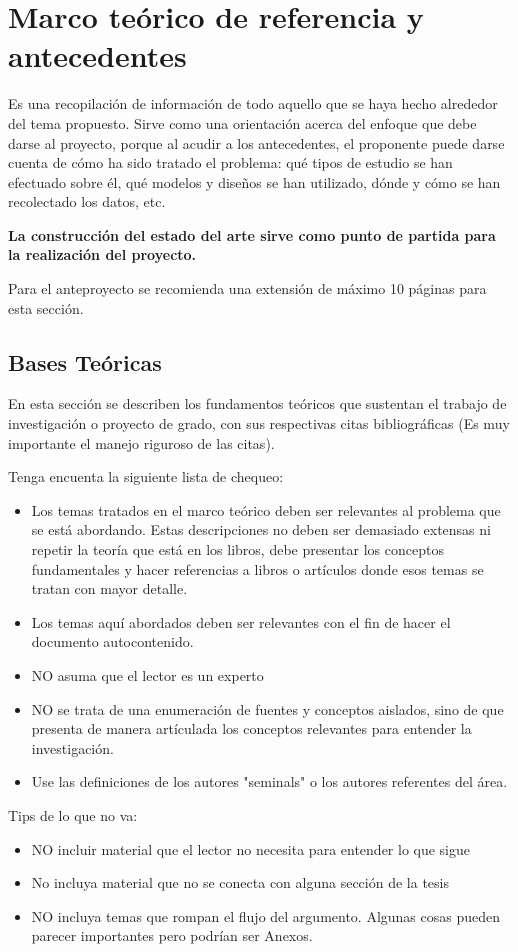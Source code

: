 \section{Marco teórico de referencia y antecedentes}
Es una recopilación de información de todo aquello que se haya hecho alrededor del tema propuesto. Sirve como una orientación acerca del enfoque que debe darse al proyecto, porque al acudir a los antecedentes, el proponente puede darse cuenta de cómo ha sido tratado el problema: qué tipos de estudio se han efectuado sobre él, qué modelos y diseños se han utilizado, dónde y cómo se han recolectado los datos, etc. 

\textbf{La construcción del estado del arte sirve como punto de partida para la realización del proyecto.}

Para el anteproyecto se recomienda una extensión de máximo 10 páginas para esta sección.

\subsection{Bases Teóricas}
En esta sección se describen los fundamentos teóricos que sustentan el trabajo de investigación o proyecto de grado, con sus respectivas citas bibliográficas (Es muy importante el manejo riguroso de las citas). 

Tenga encuenta la siguiente lista de chequeo:
\begin{itemize}
    \item Los temas tratados en el marco teórico deben ser relevantes al problema que se está abordando. Estas descripciones no deben ser demasiado extensas ni repetir la teoría que está en los libros, debe presentar los conceptos fundamentales y hacer referencias a libros o artículos donde esos temas se tratan con mayor detalle. 
    \item Los temas aquí abordados deben ser relevantes con el fin de hacer el documento autocontenido.
    \item NO asuma que el lector es un experto 
    \item NO se trata de una enumeración de
fuentes y conceptos aislados, sino de que presenta de manera artículada los conceptos relevantes para entender la investigación. 
\item Use las definiciones de los autores "seminals" o los autores referentes del área. 
\end{itemize}

Tips de lo que no va:
\begin{itemize}
\item  NO incluir material que el lector no necesita para entender lo que sigue
\item  No incluya material que no se conecta con alguna sección de la tesis
\item NO incluya temas que rompan el flujo del argumento. Algunas cosas pueden parecer importantes pero podrían ser Anexos. 
\end{itemize}

